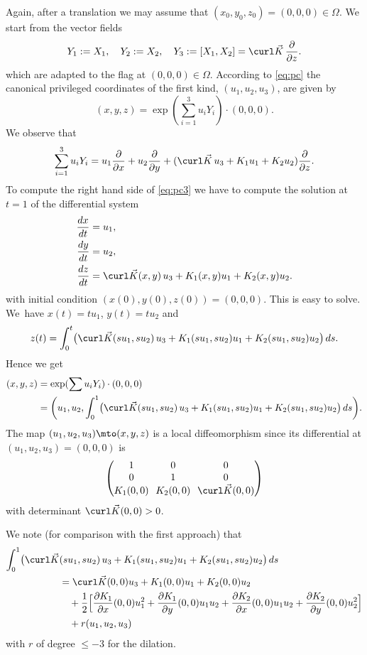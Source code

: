 Again, after a translation we may assume that $(x_0,y_0,z_0)= (0,0,0)\in\Omega$.
We start from the vector fields
\[
Y_1:=X_1,\quad
Y_2:=X_2,\quad
Y_3:=[X_1,X_2] = \curl \vec K\,\frac{\partial}{\partial z}.
\]
which are adapted to the flag at $(0,0,0)\in\Omega$. According to \eqref{eq:pc} the canonical privileged coordinates of the first kind, $(u_1,u_2,u_3)$, are given by
\begin{equation}\label{eq:pc3}
(x,y,z)= \exp (\sum_{i=1}^3 u_{i}Y_i) \cdot (0,0,0).
\end{equation}
We observe that
\[
\sum_{i=1}^3 u_{i}Y_i = u_1 \frac{\partial}{\partial x} + u_2 \frac{\partial}{\partial y} +(\curl \vec K\,u_3 + K_1 u_1 + K_2 u_2) \frac{\partial}{\partial z}.
\]
To compute the right hand side of \eqref{eq:pc3} we have to compute the solution at $t=1$ of the differential system
\begin{align*}
\frac{dx}{dt} &=u_1,\\
\frac{dy}{dt} &=u_2, \\
\frac{dz}{dt} &= \curl \vec K (x,y)\,u_3 + K_1(x,y) u_1 + K_2 (x,y)u_2.
\end{align*}
with initial condition $(x(0),y(0),z(0))=(0,0,0)$.
This is easy to solve. We~have $x(t)= tu_1$, $y(t) =t u_2$ and
\[
z(t) = \int_0^t \bigl(\curl \vec K (su_1,su_2)\,u_3 + K_1(su_1,su_2) u_1 + K_2 (su_1,su_2)u_2\bigr)\,ds.
\]
Hence we get
\begin{align*}
(x,y,z) & =\exp (\sum u_{i}Y_i) \cdot (0,0,0)\\
&= \biggl(u_1,u_2, \int_0^1\bigl(\curl \vec K (su_1,su_2)\,u_3 + K_1(su_1,su_2) u_1 + K_2 (su_1,su_2)u_2\bigr) \,ds\biggr).
\end{align*}
The map $(u_1,u_2,u_3) \mto (x,y,z)$ is a local diffeomorphism since its differential at $(u_1,u_2,u_3)=(0,0,0)$ is
\[\arraycolsep3.5pt
\begin{pmatrix}
1&0&0\\
0&1&0\\
K_1(0,0)&K_2(0,0)&\curl \vec K (0,0)
\end{pmatrix}
\]
with determinant $\curl \vec K (0,0)>0$.

We note (for comparison with the first approach) that
\begin{align*}
\int_0^1\bigl(\curl \vec K &(su_1,su_2)\,u_3 + K_1(su_1,su_2) u_1 + K_2 (su_1,su_2)u_2\bigr)\,ds \\
& = \curl \vec K (0,0) u_3 + K_1(0,0) u_1+ K_2(0,0) u_2\\
& \quad
+ \frac12 \Big[ \frac{\partial K_1}{\partial x}(0,0) u_1^2+ \frac{\partial K_1}{\partial y}(0,0) u_1u_2 + \frac{\partial K_2}{\partial x}(0,0) u_1u_2 + \frac{\partial K_2}{\partial y}(0,0) u_2^2\Big]\\
& \quad + r(u_1,u_2,u_3)
\end{align*}
with $r$ of degree $\leq -3$ for the dilation.


